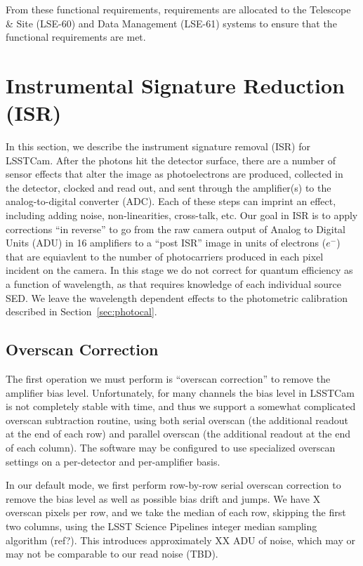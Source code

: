 \documentclass[SE,authoryear,lsstdraft,toc]{lsstdoc}
\newcommand{\etron}{e^{-}}
\begin{document}
From these functional requirements, requirements are allocated to the Telescope
\& Site (LSE-60) and Data Management (LSE-61) systems to ensure that the
functional requirements are met.

\section{Instrumental Signature Reduction (ISR)}

In this section, we describe the instrument signature removal (ISR) for
LSSTCam.  After the photons hit the detector surface, there are a number of
sensor effects that alter the image as photoelectrons are produced, collected
in the detector, clocked and read out, and sent through the amplifier(s) to the
analog-to-digital converter (ADC).  Each of these steps can imprint an effect,
including adding noise, non-linearities, cross-talk, etc.  Our goal in ISR is
to apply corrections ``in reverse'' to go from the raw camera output of Analog
to Digital Units (ADU) in 16 amplifiers to a ``post ISR'' image in units of
electrons ($\etron$) that are equiavlent to the number of photocarriers
produced in each pixel incident on the camera.  In this stage we do not correct
for quantum efficiency as a function of wavelength, as that requires knowledge
of each individual source SED.  We leave the wavelength dependent effects to
the photometric calibration described in Section~\ref{sec:photocal}.


\subsection{Overscan Correction}

The first operation we must perform is ``overscan correction'' to remove the
amplifier bias level.  Unfortunately, for many channels the bias level in
LSSTCam is not completely stable with time, and thus we support a somewhat
complicated overscan subtraction routine, using both serial overscan (the
additional readout at the end of each row) and parallel overscan (the
additional readout at the end of each column).  The software may be configured
to use specialized overscan settings on a per-detector and per-amplifier basis.

In our default mode, we first perform row-by-row serial overscan correction to
remove the bias level as well as possible bias drift and jumps.  We have X
overscan pixels per row, and we take the median of each row, skipping the first
two columns, using the LSST Science Pipelines integer median sampling algorithm
(ref?).  This introduces approximately XX ADU of noise, which may or may not be
comparable to our read noise (TBD).
\end{document}

